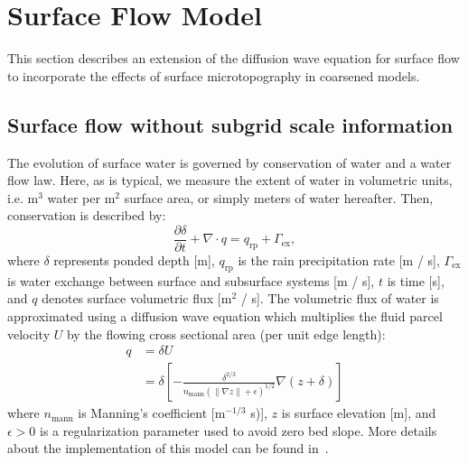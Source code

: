 \FloatBarrier

%
\section{Surface Flow Model}\label{surf-flow-system}
This section describes an extension of the diffusion wave equation for surface flow to incorporate the effects of surface microtopography in coarsened models.

%
\subsection{Surface flow without subgrid scale information}
The evolution of surface water is governed by conservation of water and a water flow law.
Here, as is typical, we measure the extent of water in volumetric units, i.e. m$^3$ water per m$^2$ surface area, or simply meters of water hereafter.
Then, conservation is described by:
%
\begin{equation}\label{diffwaveeq}
\frac{\partial \delta}{\partial t} + \nabla \cdot q = q_\text{rp} + \Gamma_\text{ex},
\end{equation}
%
where $\delta$ represents ponded depth [m], $q_\text{rp}$ is the rain precipitation rate [m / s], $\Gamma_\text{ex}$ is water exchange between surface and subsurface systems [m / s], $t$ is time [s], and $q$ denotes surface volumetric flux [m$^2$ / s].
The volumetric flux of water is approximated using a diffusion wave equation which multiplies the fluid parcel velocity $U$ by the flowing cross sectional area (per unit edge length):
%
\begin{align}
\label{diffwaveeq_flowlaw}
q &= \delta U \nonumber\\
  &= \delta \left[ -\frac{\delta^{2/3}}{n_\text{mann} (\| \nabla z\| +\epsilon)^{1/2}} \nabla(z + \delta) \right]
\end{align}
%
where $n_\text{mann}$ is Manning's coefficient [m$^{-1/3}$ s)], $z$ is surface elevation [m], and $\epsilon >0$ is a regularization parameter used to avoid zero bed slope.
More details about the implementation of this model  can be found in~\citet{spainter2016integrated}. 

%
